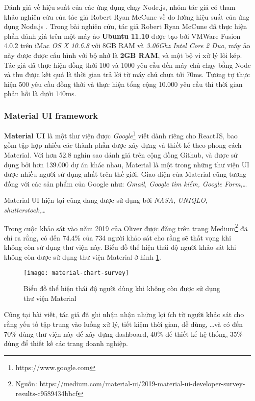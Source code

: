 \documentclass[../main-report.tex]{subfiles}
\begin{document}
Đánh giá về hiệu suất của các ứng dụng chạy Node.js, nhóm tác giả có tham khảo nghiên cứu của tác giả Robert Ryan McCune về đo lường hiệu suất của ứng dụng Node.js \cite{mccune2011node}. Trong bài nghiên cứu, tác giả Robert Ryan McCune đã thực hiện phần đánh giá trên một máy ảo \textbf{Ubuntu 11.10} được tạo bởi VMWare Fusion 4.0.2 trên iMac \textit{OS X 10.6.8} với 8GB RAM và \textit{3.06Ghz Intel Core 2 Duo}, máy ảo này được được cấu hình với bộ nhớ là \textbf{2GB RAM}, và một bộ vi xử lý lõi kép. Tác giả đã thực hiện đồng thời 100 và 1000 yêu cầu đến máy chủ chạy bằng Node và thu được kết quả là thời gian trả lời từ máy chủ chưa tới 70ms. Tương tự thực hiện 500 yêu cầu đồng thời và thực hiện tổng cộng 10.000 yêu cầu thì thời gian phản hồi là dưới 140ms.

\subsubsection{Material UI framework}
\textbf{Material UI} là một thư viện được \textit{Google}\footnote{https://www.google.com} viết dành riêng cho ReactJS, bao gồm tập hợp nhiều các thành phần được xây dựng và thiết kế theo phong cách Material. Với hơn 52.8 nghìn sao đánh giá trên cộng đồng Github, và được sử dụng bởi hơn 139.000 dự án khác nhau, Material là một trong những thư viện UI được nhiều người sử dụng nhất trên thế giới. Giao diện của Material cũng tương đồng với các sản phẩm của Google như: \textit{Gmail, Google tìm kiếm, Google Form},\ldots

Material UI hiện tại cũng đang được sử dụng bởi \textit{NASA, UNIQLO, shutterstock},\ldots

Trong cuộc khảo sát vào năm 2019 của Oliver được đăng trên trang Medium\footnote{Nguồn: https://medium.com/material-ui/2019-material-ui-developer-survey-results-c9589434bbcf} đã chỉ ra rằng, có đến 74.4\% của 734 người khảo sát cho rằng sẽ thất vọng khi không còn sử dụng thư viện này. Biểu đồ thể hiện thái độ người khảo sát khi không còn được sử dụng thư viện Material ở hình \ref{fig:material-chart-survey}.

\begin{figure}[ht!]
\begin{center}
\label{fig:material-chart-survey}
\texttt{[image: material-chart-survey]}
\caption{Biểu đồ thể hiện thái độ người dùng khi không còn được sử dụng thư viện Material}
\end{center}
\end{figure}

Cũng tại bài viết, tác giả đã ghi nhận nhận những lợi ích từ người khảo sát cho rằng yếu tố tập trung vào luồng xử lý, tiết kiệm thời gian, dễ dùng, \ldots và có đến 70\% dùng thư viện này để xây dựng dashboard, 40\% để thiết kế hệ thống, 35\% dùng để thiết kế các trang doanh nghiệp.
\end{document}
